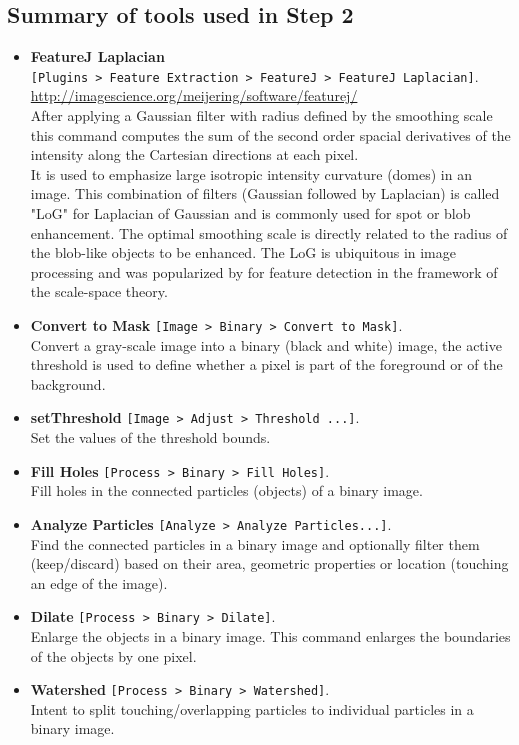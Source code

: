 \documentclass[11pt,a4paper,oneside]{report}
\newcommand{\ijmenu}[1]{\texttt{\small#1}}
\begin{document}
\subsection{Summary of tools used in Step 2}
\label{summary_of_tools_mod_3_step_2}
\begin{itemize}

\item \textbf{FeatureJ Laplacian}\\
\ijmenu{[Plugins > Feature Extraction > FeatureJ > FeatureJ Laplacian]}.\\
\url{http://imagescience.org/meijering/software/featurej/}\\
 After applying a Gaussian filter with radius defined by the smoothing scale this command computes the sum of the second order spacial derivatives of the intensity along the Cartesian directions at each pixel. \\
It is used to emphasize large isotropic intensity curvature (domes) in an image. This combination of filters (Gaussian followed by Laplacian) is called "LoG" for Laplacian of Gaussian and is commonly used for spot or blob enhancement. The optimal smoothing scale is directly related to the radius of the blob-like objects to be enhanced. The LoG is ubiquitous in image processing and was popularized by \cite{lindeberg1993scale} for feature detection in the framework of the scale-space theory.

\item \textbf{Convert to Mask} \ijmenu{[Image > Binary > Convert to Mask]}.\\
Convert a gray-scale image into a binary (black and white) image, the active threshold is used to define whether a pixel is part of the foreground or of the background. 

\item \textbf{setThreshold} \ijmenu{[Image > Adjust > Threshold ...]}.\\
Set the values of the threshold bounds.

\item \textbf{Fill Holes} \ijmenu{[Process > Binary > Fill Holes]}.\\
Fill holes in the connected particles (objects) of a binary image. 

\item \textbf{Analyze Particles}  \ijmenu{[Analyze > Analyze Particles...]}.\\
Find the connected particles in a binary image and optionally filter them (keep/discard) based on their area, geometric properties or location (touching an edge of the image).

\item \textbf{Dilate} \ijmenu{[Process > Binary > Dilate]}.\\
Enlarge the objects in a binary image. This command enlarges the boundaries of the objects by one pixel. 

\item \textbf{Watershed} \ijmenu{[Process > Binary > Watershed]}.\\
Intent to split touching/overlapping particles to individual particles in a binary image.
\end{itemize}
 
\end{document}
